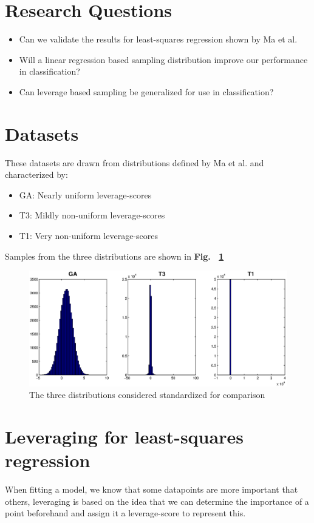 \documentclass{article}
\begin{document}
\section{Research Questions}
\begin{itemize}
	\item Can we validate the results for least-squares regression shown by Ma et al. \cite{Ma}
	\item Will a linear regression based sampling distribution improve our performance in classification?
	\item Can leverage based sampling be generalized for use in classification?
\end{itemize}

\section{Datasets}
These datasets are drawn from distributions defined by Ma et al. \cite{Ma} and characterized by:
\begin{itemize}
	\item GA: Nearly uniform leverage-scores
	\item T3: Mildly non-uniform leverage-scores
	\item T1: Very non-uniform leverage-scores
\end{itemize}  
Samples from the three distributions are shown in {\bf Fig.~ \ref{fig:datasets}}

\begin{figure}[t]
\centering
\includegraphics[width=\linewidth]{images/Data_distributions}
\caption{The three distributions considered standardized for comparison}
\label{fig:datasets}
\end{figure}
%

\section{Leveraging for least-squares regression}
When fitting a model, we know that some datapoints are more important that others, leveraging is based on the idea that we can determine the importance of a point beforehand and assign it a leverage-score to represent this.
\end{document}
